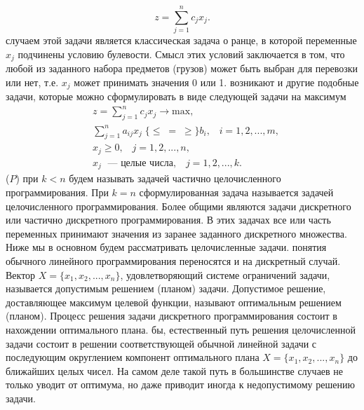 $$z = \sum_{j=1}^n c_jx_j.$$
 случаем этой задачи является классическая задача о ранце, в которой переменные $x_j$ подчинены условию булевости. Смысл этих условий заключается в том, что любой из заданного набора предметов (грузов) может быть выбран для перевозки или нет, т.е. $x_j$ может принимать значения 0 или 1.
 возникают и другие подобные задачи, которые можно сформулировать в виде следующей задачи на максимум
\begin{equation}
\label{equation_5_1}
\begin{split}
	&z = \sum_{j=1}^n c_jx_j \rightarrow \textrm{max},\\
	&\sum_{j=1}^n a_{ij}x_j\;\{\leq\;=\;\geq\}b_i,\;\;\;i = 1,2,...,m,\\
	&x_j \geq 0,\;\;\; j = 1,2,...,n,\\
	&x_j \;\textrm{ — целые числа},\;\;\; j = 1,2,...,k.
\end{split}
\tag{P}
\end{equation}
 ($P$) при $k<n$ будем называть задачей частично целочисленного программирования. При $k=n$ сформулированная задача называется задачей целочисленного программирования. Более общими являются задачи дискретного или частично дискретного программирования. В этих задачах все или часть переменных принимают значения из заранее заданного дискретного множества. Ниже мы в основном будем рассматривать целочисленные задачи.
 понятия обычного линейного программирования переносятся и на дискретный случай. Вектор $X = \{x_1,x_2,...,x_n\}$, удовлетворяющий системе ограничений задачи, называется допустимым решением (планом) задачи. Допустимое решение, доставляющее максимум целевой функции, называют оптимальным решением (планом). Процесс решения задачи дискретного программирования состоит в нахождении оптимального плана.
 бы, естественный путь решения целочисленной задачи состоит в решении соответствующей обычной линейной задачи с последующим округлением компонент оптимального плана $X = \{x_1,x_2,...,x_n\}$ до ближайших целых чисел. На самом деле такой путь в большинстве случаев не только уводит от оптимума, но даже приводит иногда к недопустимому решению задачи.
